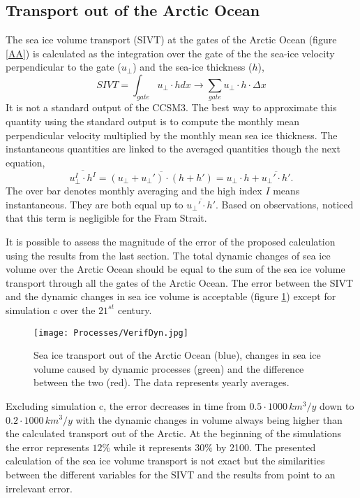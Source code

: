 \subsection{Transport out of the Arctic Ocean}\label{transport}

The sea ice volume transport (SIVT) at the gates of the Arctic Ocean (figure \ref{AA}) is calculated as the integration over the gate of the the sea-ice velocity perpendicular to the gate ($u_\perp$) and the sea-ice thickness ($h$),
\begin{equation}
SIVT = \int_{gate} u_\perp \cdot h dx \rightarrow \sum_{gate} u_\perp \cdot h \cdot \Delta x
\end{equation}
It is not a standard output of the CCSM3. The best way to approximate this quantity using the standard output is to compute the monthly mean perpendicular velocity multiplied by the monthly mean sea ice thickness. The instantaneous quantities are linked to the averaged quantities though the next equation,
\begin{equation}
\overline{u_\perp^I \cdot h^I} = \overline{(u_\perp+ u_\perp') \cdot (h+h')} = u_\perp \cdot h + \overline{u_\perp' \cdot h'}.
\end{equation}
The over bar denotes monthly averaging and the high index $I$ means instantaneous. They are both equal up to $\overline{u_\perp' \cdot h'}$. Based on observations, \cite{Arfeuille} noticed that this term is negligible for the Fram Strait.  

It is possible to assess the magnitude of the error of the proposed calculation using the results from the last section. The total dynamic changes of sea ice volume over the Arctic Ocean should be equal to the sum of the sea ice volume transport through all the gates of the Arctic Ocean. The error between the SIVT and the dynamic changes in sea ice volume is acceptable (figure \ref{VerifDyn}) except for simulation c over the $21^{st}$ century. 
\begin{figure}[t!]
\center
\noindent\texttt{[image: Processes/VerifDyn.jpg]}
\caption{Sea ice transport out of the Arctic Ocean (blue), changes in sea ice volume caused by dynamic processes (green) and the difference between the two (red). The data represents yearly averages.}
\label{VerifDyn}
\end{figure}
Excluding simulation c, the error decreases in time from $0.5 \cdot 1000 \, km^3/y$ down to $0.2 \cdot 1000 \, km^3/y$ with the dynamic changes in volume always being higher than the calculated transport out of the Arctic. At the beginning of the simulations the error represents $12\%$ while it represents $30\%$ by 2100. The presented calculation of the sea ice volume transport is not exact but the similarities between the different variables for the SIVT and the results from \cite{Arfeuille} point to an irrelevant error. 

